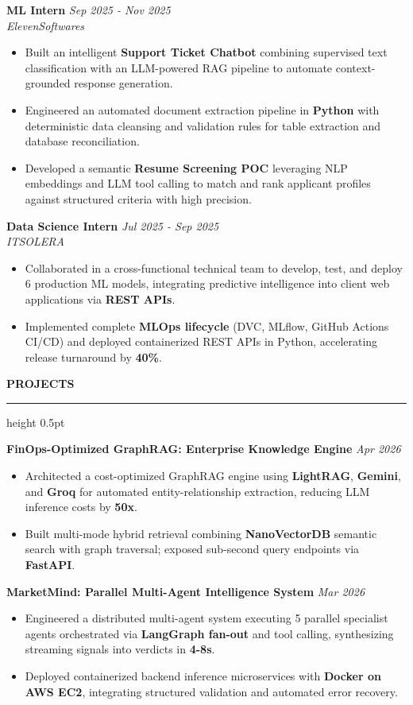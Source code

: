 \documentclass[10pt,letterpaper]{article}
\newcommand{\resumesection}[1]{%
  \vspace{3.5pt}%
  {\fontsize{10.5pt}{12pt}\selectfont\textbf{\MakeUppercase{#1}}}%
  \vspace{1.5pt}%
  \hrule height 0.5pt%
  \vspace{2.5pt}%
}
\begin{document}
\vspace{2pt}
\noindent\textbf{ML Intern} \hfill \textit{Sep 2025 - Nov 2025} \\
\textit{ElevenSoftwares}
\begin{itemize}
  \item Built an intelligent \textbf{Support Ticket Chatbot} combining supervised text classification with an LLM-powered RAG pipeline to automate context-grounded response generation.
  \item Engineered an automated document extraction pipeline in \textbf{Python} with deterministic data cleansing and validation rules for table extraction and database reconciliation.
  \item Developed a semantic \textbf{Resume Screening POC} leveraging NLP embeddings and LLM tool calling to match and rank applicant profiles against structured criteria with high precision.
\end{itemize}

\vspace{2pt}
\noindent\textbf{Data Science Intern} \hfill \textit{Jul 2025 - Sep 2025} \\
\textit{ITSOLERA}
\begin{itemize}
  \item Collaborated in a cross-functional technical team to develop, test, and deploy 6 production ML models, integrating predictive intelligence into client web applications via \textbf{REST APIs}.
  \item Implemented complete \textbf{MLOps lifecycle} (DVC, MLflow, GitHub Actions CI/CD) and deployed containerized REST APIs in Python, accelerating release turnaround by \textbf{40\%}.
\end{itemize}

\resumesection{Projects}
\noindent\textbf{FinOps-Optimized GraphRAG: Enterprise Knowledge Engine} \hfill \textit{Apr 2026}
\begin{itemize}
  \item Architected a cost-optimized GraphRAG engine using \textbf{LightRAG}, \textbf{Gemini}, and \textbf{Groq} for automated entity-relationship extraction, reducing LLM inference costs by \textbf{50x}.
  \item Built multi-mode hybrid retrieval combining \textbf{NanoVectorDB} semantic search with graph traversal; exposed sub-second query endpoints via \textbf{FastAPI}.
\end{itemize}

\vspace{2pt}
\noindent\textbf{MarketMind: Parallel Multi-Agent Intelligence System} \hfill \textit{Mar 2026}
\begin{itemize}
  \item Engineered a distributed multi-agent system executing 5 parallel specialist agents orchestrated via \textbf{LangGraph fan-out} and tool calling, synthesizing streaming signals into verdicts in \textbf{4-8s}.
  \item Deployed containerized backend inference microservices with \textbf{Docker on AWS EC2}, integrating structured validation and automated error recovery.
\end{itemize}
\end{document}
